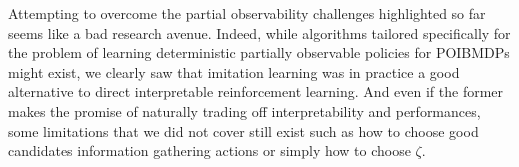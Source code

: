 Attempting to overcome the partial observability challenges highlighted so far seems like a bad research avenue.
Indeed, while algorithms tailored specifically for the problem of learning deterministic partially observable policies for POIBMDPs might exist, we clearly saw that imitation learning was in practice a good alternative to direct interpretable reinforcement learning.
And even if the former makes the promise of naturally trading off interpretability and performances, some limitations that we did not cover still exist such as how to choose good candidates information gathering actions or simply how to choose $\zeta$.
